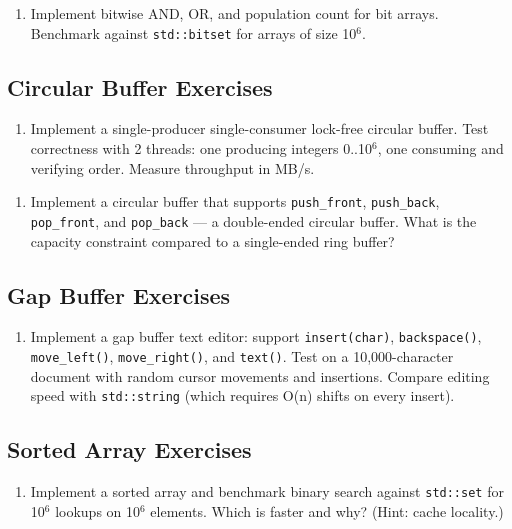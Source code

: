 \begin{enumerate}
\item Implement bitwise AND, OR, and population count for bit arrays. Benchmark against \texttt{std::bitset} for arrays of size 10$^{6}$.
\end{enumerate}

\subsection{Circular Buffer Exercises}

\begin{enumerate}
\item Implement a single-producer single-consumer lock-free circular buffer. Test correctness with 2 threads: one producing integers 0..10$^{6}$, one consuming and verifying order. Measure throughput in MB/s.
\end{enumerate}

\begin{enumerate}
\item Implement a circular buffer that supports \texttt{push\_front}, \texttt{push\_back}, \texttt{pop\_front}, and \texttt{pop\_back} — a double-ended circular buffer. What is the capacity constraint compared to a single-ended ring buffer?
\end{enumerate}

\subsection{Gap Buffer Exercises}

\begin{enumerate}
\item Implement a gap buffer text editor: support \texttt{insert(char)}, \texttt{backspace()}, \texttt{move\_left()}, \texttt{move\_right()}, and \texttt{text()}. Test on a 10,000-character document with random cursor movements and insertions. Compare editing speed with \texttt{std::string} (which requires O(n) shifts on every insert).
\end{enumerate}

\subsection{Sorted Array Exercises}

\begin{enumerate}
\item Implement a sorted array and benchmark binary search against \texttt{std::set} for 10$^{6}$ lookups on 10$^{6}$ elements. Which is faster and why? (Hint: cache locality.)
\end{enumerate}

